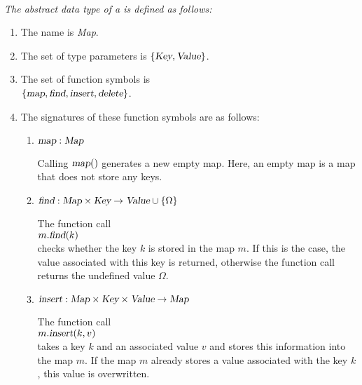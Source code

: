\begin{Definition}[Map] \hspace*{\fill} \\
{\em
  The abstract data type of a  is defined as follows:
  \begin{enumerate}
  \item The name is \textsl{Map}.
  \item The set of type parameters is $\{ \textsl{Key}, \textsl{Value} \}$.
  \item The set of function symbols is \\[0.1cm]
       \hspace*{1.3cm} 
       $\{ \textsl{map}, \textsl{find}, \textsl{insert}, \textsl{delete} \}$.
  \item The signatures of these function symbols are as follows:
        \begin{enumerate}
        \item $\textsl{map}: \textsl{Map}$

              Calling $\textsl{map}()$ generates a new empty map.  Here, an empty map is a map that
              does not store any keys.
        \item $\textsl{find}: \textsl{Map} \times \textsl{Key} \rightarrow \textsl{Value} \cup \{\Omega\}$

              The function call
              \\[0.2cm]
              \hspace*{1.3cm}
              $m.\textsl{find}(k)$ 
              \\[0.2cm]
              checks whether the key $k$ is stored in the map $m$.  If this is the case, the
              value associated with this key is returned, otherwise the function call returns
              the undefined value $\Omega$.
        \item $\textsl{insert}: \textsl{Map} \times \textsl{Key} \times \textsl{Value} \rightarrow \textsl{Map}$

              The function call
              \\[0.2cm]
              \hspace*{1.3cm}
              $m.\textsl{insert}(k,v)$ 
              \\[0.2cm]
              takes a key $k$ and an associated value $v$ and stores this information into the map
              $m$.  If the map $m$ already stores a value associated with the key $k$, this value
              is overwritten.  


\end{enumerate}
\end{enumerate}}
\end{Definition}
